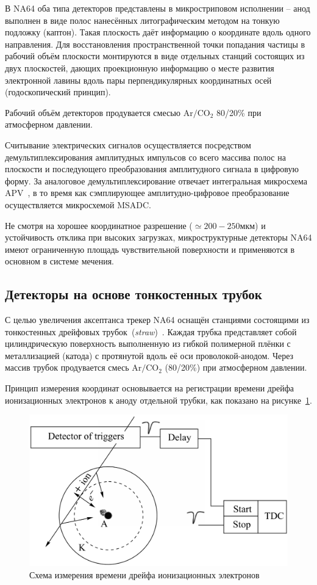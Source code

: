В NA64 оба типа детекторов представлены в микростриповом исполнении --
анод выполнен в виде полос нанесённых литографическим методом на тонкую
подложку (каптон). Такая плоскость даёт информацию
о координате вдоль одного направления. Для восстановления пространственной
точки попадания частицы в рабочий объём плоскости монтируются в виде
отдельных станций состоящих из двух плоскостей, дающих проекционную
информацию о месте развития электронной лавины вдоль пары перпендикулярных
координатных осей (годоскопический принцип).

Рабочий объём детекторов продувается смесью $\text{Ar}/\text{CO}_2$ 80/20\%
при атмосферном давлении.

Считывание электрических сигналов осуществляется посредством
демультиплексирования амплитудных импульсов со всего массива полос на
плоскости и последующего преобразования амплитудного сигнала в цифровую форму.
За аналоговое демультиплексирование отвечает интегральная
микросхема APV~\cite{apv-jones},
в то время как сэмплирующее амплитудно-цифровое преобразование осуществляется
микросхемой MSADC.

Не смотря на хорошее координатное разрешение ($\simeq 200-250\text{мкм}$) и
устойчивость отклика при высоких загрузках, микроструктурные
детекторы NA64 имеют ограниченную площадь чувствительной поверхности и
применяются в основном в системе мечения.

\subsection{Детекторы на основе тонкостенных трубок}

С целью увеличения аксептанса трекер NA64 оснащён станциями состоящими из
тонкостенных дрейфовых трубок~(\emph{straw})~\cite{straws-volkov2019, straws-peshekhonov2015}.
Каждая трубка представляет собой цилиндрическую поверхность выполненную
из гибкой полимерной плёнки с металлизацией (катода) с протянутой
вдоль её оси проволокой-анодом. Через массив трубок продувается
смесь $\text{Ar}/\text{CO}_2$ (80/20\%) при атмосферном давлении.

Принцип измерения координат основывается на регистрации времени дрейфа
ионизационных электронов к аноду отдельной трубки, как показано
на рисунке~\ref{fig:straws-measurement}.

\begin{figure}
    \centering
    \includegraphics[width=0.5\linewidth]{images//illustrative/strawa-principle.png}
    \caption{Схема измерения времени дрейфа ионизационных электронов~\cite{straws-peshekhonov2015}}
    \label{fig:straws-measurement}
\end{figure}

